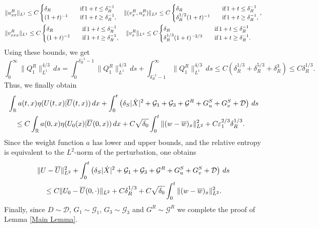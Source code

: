 \documentclass[11pt,reqno]{amsart}
\begin{document}
    \begin{align*}
    &\|u^R_{xx}\|_{L^1} \le C \begin{cases}
    \delta_R\quad &\mbox{if}\,1+t\le \delta_R^{-1}\\
    (1+t)^{-1}\quad&\mbox{if}\,1+t\ge \delta_R^{-1},
    \end{cases} \quad  \|(v^R_{x},u^R_{x})\|_{L^2} \le C \begin{cases}
    \delta_R\quad &\mbox{if}\,1+t\le \delta_R^{-1}\\
    \delta_R^{1/2}(1+t)^{-1}\quad&\mbox{if}\,1+t\ge \delta_R^{-1},
    \end{cases}, \\
    &\|v^R_{xxx}\|_{L^1} \le C \begin{cases}
    \delta_R\quad &\mbox{if}\,1+t\le \delta_R^{-1}\\
    (1+t)^{-1}\quad&\mbox{if}\,1+t\ge \delta_R^{-1},
    \end{cases} \quad  \|v^R_{x}\|_{L^3} \le C \begin{cases}
    \delta_R\quad &\mbox{if}\,1+t\le \delta_R^{-1}\\
    \delta_R^{1/3}(1+t)^{-2/3}\quad&\mbox{if}\,1+t\ge \delta_R^{-1}.
    \end{cases}
    \end{align*}
    Using these bounds, we get
    \[\int_0^\infty \|Q_1^R\|_{L^1}^{4/3}\,ds = \int_0^{\delta_R^{-1}-1}\|Q_1^R\|_{L^1}^{4/3}\,ds+\int_{\delta_R^{-1}-1}^\infty\|Q_1^R\|_{L^1}^{4/3}\,ds \le C (\delta_R^{1/3} + \delta_R^{5/3}+\delta_R^3) \le C \delta_R^{1/3}. \]
    Thus, we finally obtain
    \begin{align*}
    & \int_\mathbb{R} a(t,x) \eta (U (t,x) | \overline{U} (t,x) ) \, dx + \int_0^t \left( \delta_S |\dot{X}|^2 + \mathcal{G}_1+ \mathcal{G}_3 +\mathcal{G}^R + G^S_u+ G^S_v+ \mathcal{D} \right) \, ds \\ 
    & \quad \le C  \int_\mathbb{R} a(0,x) \eta ( U_0(x)| \overline{U}(0,x)) \, dx + C \sqrt{\delta_0} \int_0^t \|(w-\overline{w})_x\|_{L^2}^2  + C\varepsilon_1^{2/3}\delta_R^{1/3}.
    \end{align*}
    Since the weight function $a$ has lower and upper bounds, and the relative entropy is equivalent to the $L^2$-norm of the perturbation, one obtains 
    \begin{align*}
    & \| U-\overline{U} \|_{L^2}^2 + \int_0^t \left( \delta_S |\dot{X}|^2 + \mathcal{G}_1+ \mathcal{G}_3 +\mathcal{G}^R + G^S_u+ G^S_v+ \mathcal{D} \right) \, ds \\ 
    & \quad \le C  \| U_0 -\overline{U} (0, \cdot) \|_{L^2} +C \delta_R^{1/3} + C \sqrt{\delta_0} \int_0^t \|(w-\overline{w})_x\|_{L^2}^2 .
    \end{align*}
    Finally, since $D \sim \mathcal{D}$, $G_1 \sim \mathcal{G}_1$, $G_3 \sim \mathcal{G}_3$ and $G^R \sim \mathcal{G}^R$ we complete the proof of Lemma \ref{Main Lemma}.
    
\end{document}
